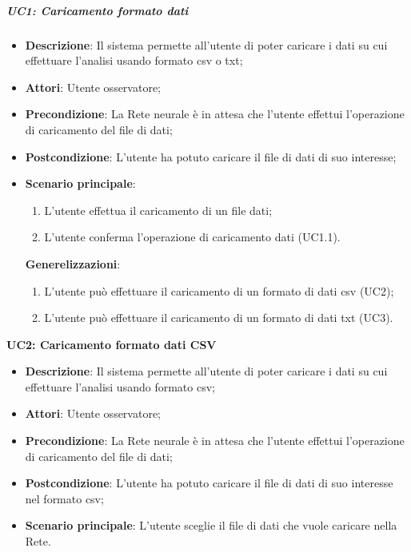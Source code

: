 \subparagraph{UC1: Caricamento formato dati}\mbox{}
\label{UC1: Caricamento formato dati}
\noindent
\begin{itemize}
\item \textbf{Descrizione}: Il sistema permette all'utente di poter caricare i dati su cui effettuare l'analisi usando formato csv o txt;
\item \textbf{Attori}: Utente osservatore;
\item \textbf{Precondizione}: La Rete neurale \`e in attesa che l'utente effettui l'operazione di caricamento del file di dati;
\item \textbf{Postcondizione}: L'utente ha potuto caricare il file di dati di suo interesse;
\item \textbf{Scenario principale}:
\begin{enumerate}
\item L'utente effettua il caricamento di un file dati;
\item L'utente conferma l'operazione di caricamento dati (UC1.1).
\end{enumerate}
\textbf{Generelizzazioni}:
\begin{enumerate}
\item L'utente pu\`o effettuare il caricamento di un formato di dati csv (UC2);
\item L'utente pu\`o effettuare il caricamento di un formato di dati txt (UC3).
\end{enumerate}
\end{itemize}


\textbf{UC2: Caricamento formato dati CSV}\mbox{}
\label{UC2: Caricamento formato dati CSV}
\begin{itemize}
\item \textbf{Descrizione}: Il sistema permette all'utente di poter caricare i dati su cui effettuare l'analisi usando formato csv;
\item \textbf{Attori}: Utente osservatore;
\item \textbf{Precondizione}: La Rete neurale \`e in attesa che l'utente effettui l'operazione di caricamento del file di dati;
\item \textbf{Postcondizione}: L'utente ha potuto caricare il file di dati di suo interesse nel formato csv;
\item \textbf{Scenario principale}: L'utente sceglie il file di dati che vuole caricare nella Rete.
\end{itemize}


